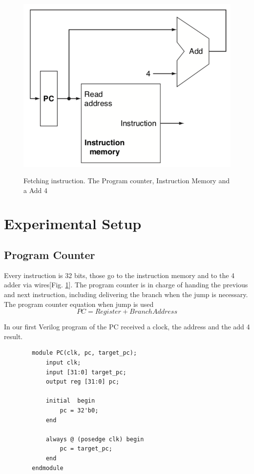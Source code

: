 \documentclass[conference]{IEEEtran}
\begin{document}
    \begin{figure}[h]
        \caption{Fetching instruction. The Program counter, Instruction Memory and a Add 4}
        \centering
        \includegraphics[scale=0.5]{images/fetching-ins.png}
        \label{fig:Fetching-ins}
    \end{figure}
    

\section{Experimental Setup}

\subsection{Program Counter}
    Every instruction is 32 bits, those go to the instruction memory and to the 4 adder via wires[Fig. \ref{fig:Fetching-ins}]. The program counter is in charge of handing the previous and next instruction, including delivering the branch when the jump is necessary.
    The program counter equation when jump is used
    \[PC = Register + Branch Address\]
    
        In our first Verilog program of the PC received a clock, the address and the add 4 result.
        \begin{lstlisting}
        module PC(clk, pc, target_pc);
    	    input clk;
    	    input [31:0] target_pc;
    	    output reg [31:0] pc;
    
    	    initial  begin
    		    pc = 32'b0;
    	    end
    	
    	    always @ (posedge clk) begin
    		    pc = target_pc;
    	    end
        endmodule
        \end{lstlisting}
        
\end{document}
